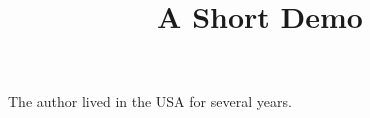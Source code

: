 \documentclass[article]{jss}
\title{A Short Demo}
\begin{document}
The author lived in the USA for several years.
\end{document}
